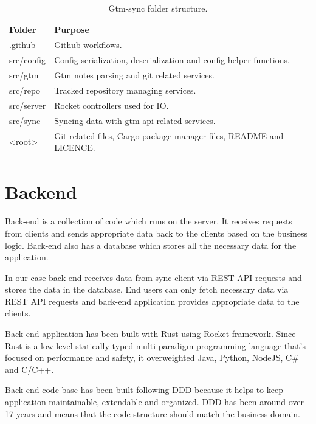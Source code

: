 \begin{table}[h]
    \centering
    \begin{tabular}{ | p{3cm} | p{10cm} |}
        \hline
        Folder & Purpose\\
        \hline
        .github & Github workflows.\\
        \hline
        src/config & Config serialization, deserialization and config helper functions.\\
        \hline
        src/gtm & Gtm notes parsing and git related services.\\
        \hline
        src/repo & Tracked repository managing services.\\
        \hline
        src/server & Rocket controllers used for IO.\\
        \hline
        src/sync & Syncing data with gtm-api related services.\\
        \hline
        <root> & Git related files, Cargo package manager files, README and LICENCE.\\
        \hline
    \end{tabular}
    \caption{Gtm-sync folder structure.}
    \label{tab:gtm-sync-folder-structure}
\end{table}

\section{Backend}\label{sec:backend}
Back-end is a collection of code which runs on the server.
It receives requests from clients and sends appropriate data back to the clients based on the business logic.
Back-end also has a database which stores all the necessary data for the application.

In our case back-end receives data from sync client via REST API requests and stores the data in the database.
End users can only fetch necessary data via REST API requests and back-end application provides appropriate data to the clients.

Back-end application has been built with Rust using Rocket framework.
Since Rust is a low-level statically-typed multi-paradigm programming language that's focused on performance and safety, it overweighted Java, Python, NodeJS, C\# and C/C++.

Back-end code base has been built following DDD because it helps to keep application maintainable, extendable and organized.
DDD has been around over 17 years and means that the code structure should match the business domain.

